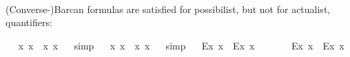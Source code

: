\begin{isabellebody}
%
\ %
%
\isamarkupfalse%
\ %
%
%
%
%
\begin{isamarkuptext}%
(Converse-)Barcan formulas are satisfied for possibilist, but not for actualist, quantifiers:%
\end{isamarkuptext}\isamarkuptrue%
\ \isamarkupfalse%
\ {\isachardoublequoteopen}{\isasymlfloor}{\isacharparenleft}\isactrlbold {\isasymforall}x{\isachardot}\isactrlbold {\isasymbox}{\isacharparenleft}{\isasymphi}\ x{\isacharparenright}{\isacharparenright}\ \isactrlbold {\isasymrightarrow}\ \isactrlbold {\isasymbox}{\isacharparenleft}\isactrlbold {\isasymforall}x{\isachardot}{\isacharparenleft}{\isasymphi}\ x{\isacharparenright}{\isacharparenright}{\isasymrfloor}{\isachardoublequoteclose}%
\ %
%
\isamarkupfalse%
\ simp%
%
%
\isanewline
\ \isamarkupfalse%
\ {\isachardoublequoteopen}{\isasymlfloor}\isactrlbold {\isasymbox}{\isacharparenleft}\isactrlbold {\isasymforall}x{\isachardot}{\isacharparenleft}{\isasymphi}\ x{\isacharparenright}{\isacharparenright}\ \isactrlbold {\isasymrightarrow}\ {\isacharparenleft}\isactrlbold {\isasymforall}x{\isachardot}\isactrlbold {\isasymbox}{\isacharparenleft}{\isasymphi}\ x{\isacharparenright}{\isacharparenright}{\isasymrfloor}{\isachardoublequoteclose}%
\ %
%
\isamarkupfalse%
\ simp%
%
%
\isanewline
\ \isamarkupfalse%
\ {\isachardoublequoteopen}{\isasymlfloor}{\isacharparenleft}\isactrlbold {\isasymforall}\isactrlsup Ex{\isachardot}\isactrlbold {\isasymbox}{\isacharparenleft}{\isasymphi}\ x{\isacharparenright}{\isacharparenright}\ \isactrlbold {\isasymrightarrow}\ \isactrlbold {\isasymbox}{\isacharparenleft}\isactrlbold {\isasymforall}\isactrlsup Ex{\isachardot}{\isacharparenleft}{\isasymphi}\ x{\isacharparenright}{\isacharparenright}{\isasymrfloor}{\isachardoublequoteclose}\ \isamarkupfalse%
%
\ %
%
\isamarkupfalse%
\ %
%
%
%
\isanewline
\ \isamarkupfalse%
\ {\isachardoublequoteopen}{\isasymlfloor}\isactrlbold {\isasymbox}{\isacharparenleft}\isactrlbold {\isasymforall}\isactrlsup Ex{\isachardot}{\isacharparenleft}{\isasymphi}\ x{\isacharparenright}{\isacharparenright}\ \isactrlbold {\isasymrightarrow}\ {\isacharparenleft}\isactrlbold {\isasymforall}\isactrlsup Ex{\isachardot}\isactrlbold {\isasymbox}{\isacharparenleft}{\isasymphi}\ x{\isacharparenright}{\isacharparenright}{\isasymrfloor}{\isachardoublequoteclose}\ \isamarkupfalse%
%
\ %
%
\isamarkupfalse%

\end{isabellebody}
